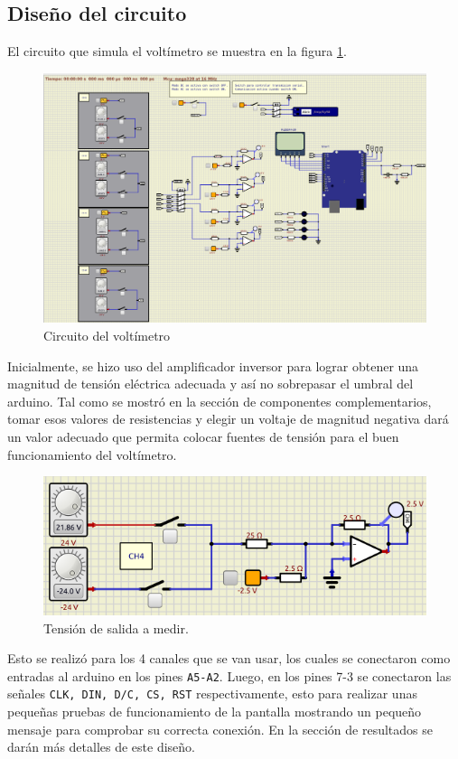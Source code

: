 \subsection*{Diseño del circuito}
El circuito que simula el voltímetro se muestra en la figura \ref{fig3}.
\begin{figure}[H]
\centering
\includegraphics[width=.8\linewidth]{Imagenes/7.png}
 \caption{Circuito del voltímetro}
 \label{fig3}
\end{figure}
Inicialmente, se hizo uso del amplificador inversor para lograr obtener una magnitud de tensión eléctrica adecuada y así no sobrepasar el umbral del arduino. Tal como se mostró en la sección de componentes complementarios, tomar esos valores de resistencias y elegir un voltaje de magnitud negativa dará un valor adecuado que permita colocar fuentes de tensión para el buen funcionamiento del voltímetro. 
\begin{figure}[H]
\centering
\includegraphics[width=.8\linewidth]{Imagenes/4.png}
 \caption{Tensión de salida a medir.}
 \label{fig4}
\end{figure}
Esto se realizó para los 4 canales que se van usar, los cuales se conectaron como entradas al arduino en los pines \texttt{A5-A2}. Luego, en los pines 7-3 se conectaron las señales \texttt{CLK, DIN, D/C, CS, RST} respectivamente, esto para realizar unas pequeñas pruebas de funcionamiento de la pantalla mostrando un pequeño mensaje para comprobar su correcta conexión. En la sección de resultados se darán más detalles de este diseño.
